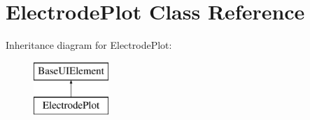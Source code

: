\hypertarget{classElectrodePlot}{\section{Electrode\-Plot Class Reference}
\label{classElectrodePlot}
}
Inheritance diagram for Electrode\-Plot\-:\begin{figure}[H]
\begin{center}
\leavevmode
\includegraphics[height=2.000000cm]{classElectrodePlot}
\end{center}
\end{figure}
